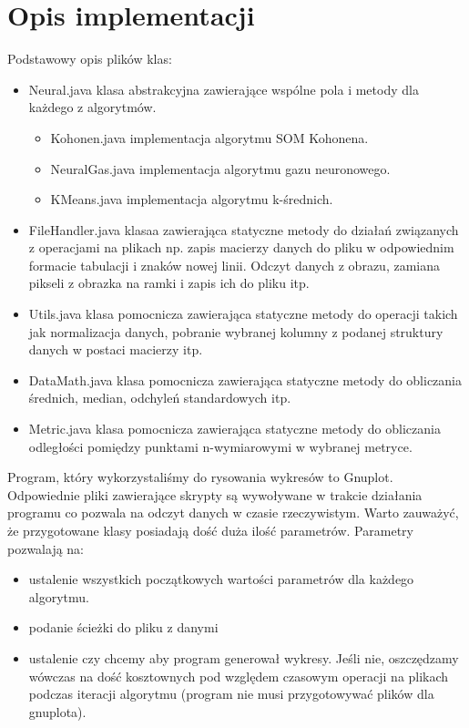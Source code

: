 \documentclass{classrep}
\begin{document}
{{\section{Opis implementacji}
Podstawowy opis plików klas:
\begin{itemize}
	\item Neural.java \ppauza klasa abstrakcyjna zawierające wspólne pola i metody dla każdego z algorytmów. 
	\begin{itemize}
		\item Kohonen.java \ppauza implementacja algorytmu SOM Kohonena.
		\item NeuralGas.java \pauza implementacja algorytmu gazu neuronowego.
		\item KMeans.java \ppauza implementacja algorytmu k-średnich. 
	\end{itemize}
	\item FileHandler.java \ppauza klasaa zawierająca statyczne metody do działań związanych z operacjami na plikach np. zapis macierzy danych do pliku w odpowiednim formacie tabulacji i znaków nowej linii. Odczyt danych z obrazu, zamiana pikseli z obrazka na ramki i zapis ich do pliku itp.  
	\item Utils.java \ppauza klasa pomocnicza zawierająca statyczne metody do operacji takich jak normalizacja danych, pobranie wybranej kolumny z podanej struktury danych w postaci macierzy itp.
	\item DataMath.java \ppauza klasa pomocnicza zawierająca statyczne metody do obliczania średnich, median, odchyleń standardowych itp.
	\item Metric.java \ppauza klasa pomocnicza zawierająca statyczne metody do obliczania odległości pomiędzy punktami n-wymiarowymi w wybranej metryce.
\end{itemize}
Program, który wykorzystaliśmy do rysowania wykresów to Gnuplot. Odpowiednie pliki zawierające skrypty są wywoływane w trakcie działania programu co pozwala na odczyt danych w czasie rzeczywistym.
Warto zauważyć, że przygotowane klasy posiadają dość duża ilość parametrów. Parametry pozwalają na:
\begin{itemize}
	\item ustalenie wszystkich początkowych wartości parametrów dla każdego algorytmu.
	\item podanie ścieżki do pliku z danymi
	\item ustalenie czy chcemy aby program generował wykresy. Jeśli nie, 
oszczędzamy wówczas na dość kosztownych pod względem czasowym operacji na plikach podczas iteracji algorytmu (program nie musi przygotowywać plików dla gnuplota). 
\end{itemize}

}}
\end{document}
